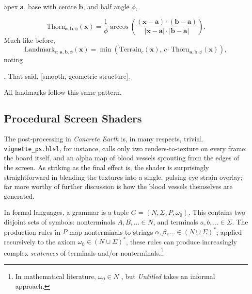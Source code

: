 \documentclass[a4paper, 11pt]{article}
\begin{document}
\begin{flushleft}
apex $\mathbf{a}$, base with centre $\mathbf{b}$, and half angle $\phi$,

$$\textrm{Thorn}_{\mathbf{a},\mathbf{b},\phi}(\mathbf{x}) = \frac{1}{\phi}\arccos\left(\frac{\left(\mathbf{x}-\mathbf{a}\right)\cdot\left(\mathbf{b}-\mathbf{a}\right)}{\left|\mathbf{x}-\mathbf{a}\right|\cdot\left|\mathbf{b}-\mathbf{a}\right|}\right).$$
Much like before,
$$\textrm{Landmark}_{c;\,\mathbf{a},\mathbf{b},\phi}(\mathbf{x}) = \min\left(\textrm{Terrain}_c(\mathbf{x}), \, c\cdot\textrm{Thorn}_{\mathbf{a},\mathbf{b},\phi}(\mathbf{x})\right),$$
noting %


\vspace{5pt}. That said, [smooth, geometric structure].

\vspace{5pt}\noindent
All landmarks follow this same pattern.

\vspace{5pt}

\subsection{Procedural Screen Shaders}\label{Procedural Screen Shaders} %

The post-processing in \textit{Concrete Earth} is, in many respects, trivial. \texttt{vignette\_ps.hlsl}, for instance, calls only two renders-to-texture on every frame: the board itself, and an alpha map of blood vessels sprouting from the edges of the screen. As striking as the final effect is, the shader is surprisingly straightforward in blending the textures into a single, pulsing eye strain overlay; far more worthy of further discussion is how the blood vessels themselves are generated.

\vspace{5pt}\noindent
In formal languages, a grammar is a tuple $G = (N,\Sigma,P,\omega_0)$. This contains two disjoint sets of symbols: nonterminals $A, B, \dots \in N$, and terminals $a, b, \dots \in \Sigma$. The production rules in $P$ map nonterminals to strings $\alpha, \beta, \dots \in (N\cup\Sigma)^*$; applied recursively to the axiom $\omega_0 \in (N\cup\Sigma)^*$, these rules can produce increasingly complex \textit{sentences} of terminals and/or nonterminals.\footnote{In mathematical literature, $
\omega_0 \in N$ \citep*{hopcroftFormalLanguages}, but \textit{Untitled} takes an informal approach.}


\end{flushleft}
\end{document}
